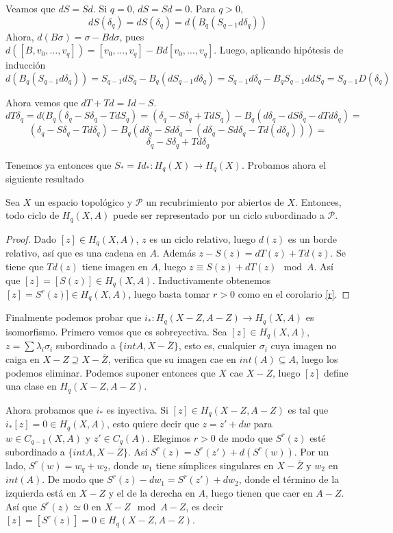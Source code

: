 \documentclass[TA.tex]{subfiles}
\begin{document}
\begin{dem}
Veamos que $dS=Sd$. Si $q=0$, $dS=Sd=0$. Para $q>0$, 
\[
dS(\delta_q)=dS(\delta_q)=d(B_q(S_{q-1} d\delta_q))
\]
Ahora, $d(B\sigma)=\sigma-Bd\sigma$, pues $d([B,v_0,\dots, v_q])=[v_0,\dots, v_q]-Bd[v_0,\dots, v_q]$. Luego, aplicando hipótesis de inducción
\[
d(B_q(S_{q-1} d\delta_q))=S_{q-1}dS_q-B_q(dS_{q-1}d\delta_q)=S_{q-1}d\delta_q-B_qS_{q-1}ddS_q=S_{q-1}D(\delta_q)
\]

Ahora vemos que $dT+Td=Id-S$. 
\[
dT\delta_q=d(B_q(\delta_q-S\delta_q-TdS_q)=(\delta_q-S\delta_q+TdS_q)-B_q(d\delta_q-dS\delta_q-dTd\delta_q)=
\]
\[
(\delta_q-S\delta_q-Td\delta_q)-B_q(d\delta_q-Sd\delta_q-(d\delta_q-Sd\delta_q-Td(d\delta_q)))=
\]
\[
\delta_q-S\delta_q+Td\delta_q
\]

Tenemos ya entonces que $S_*=Id_*:H_q(X)\to H_q(X)$. Probamos ahora el siguiente resultado
\begin{lemma}
Sea $X$ un espacio topológico y $\mathcal{P}$ un recubrimiento por abiertos de $X$. Entonces, todo ciclo de $H_q(X,A)$ puede ser representado por un ciclo subordinado a $\mathcal{P}$.
\end{lemma}
\begin{proof}
Dado $[z]\in H_q(X,A)$, $z$ es un ciclo relativo, luego $d(z)$ es un borde relativo, así que es una cadena en $A$. Además $z-S(z)=dT(z)+Td(z)$. Se tiene que $Td(z)$ tiene imagen en $A$, luego $z\equiv S(z)+dT(z)\mod A$. Así que $[z]=[S(z)]\in H_q(X,A)$. Inductivamente obtenemos $[z]=S^r(z)]\in H_q(X,A)$, luego basta tomar $r>0$ como en el corolario \ref{r}. 
\end{proof}

Finalmente podemos probar que $i_*:H_q(X-Z,A-Z)\to H_q(X,A)$ es isomorfismo. Primero vemos que es sobreyectiva. Sea $[z]\in H_q(X,A)$, $z=\sum\lambda_i\sigma_i$ subordinado a $\{int A, X-\overline{Z}\}$, esto es, cualquier $\sigma_i$ cuya imagen no caiga en $X-Z\supseteq X-\overline{Z}$, verifica que su imagen cae en $int(A)\subseteq A$, luego los podemos eliminar. Podemos suponer entonces que $X$ cae $X-Z$, luego $[z]$ define una clase  en $H_q(X-Z,A-Z)$. 

Ahora probamos que $i_*$ es inyectiva. Si $[z]\in H_q(X-Z,A-Z)$ es tal que $i_*[z]=0\in H_q(X,A)$, esto quiere decir que $z=z'+dw$ para $w\in C_{q-1}(X,A)$ y $z'\in C_q(A)$. Elegimos $r>0$ de modo que $S^r(z)$ esté subordinado a $\{intA, X-\overline{Z}\}$. Así $S^r(z)=S^r(z')+d(S^r(w))$. Por un lado, $S^r(w)=w_q+w_2$, donde $w_1$ tiene símplices singulares en $X-\overline{Z}$ y $w_2$ en $int(A)$. De modo que $S^r(z)-dw_1=S^r(z')+dw_2$, donde el término de la izquierda está en $X-Z$ y el de la derecha en $A$, luego tienen que caer en $A-Z$. Así que $S^r(z)\simeq 0$ en $X-Z\mod A-Z$, es decir $[z]=[S^r(z)]=0\in H_q(X-Z,A-Z)$.  
\end{dem}
\end{document}
